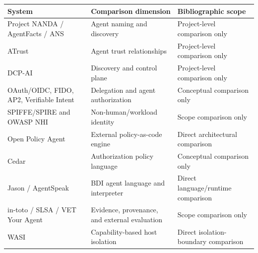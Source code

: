 \begin{tabularx}{\linewidth}{@{}XXX@{}}
\toprule
System & Comparison dimension & Bibliographic scope \\
\midrule
Project NANDA / AgentFacts / ANS & Agent naming and discovery & Project-level comparison only \\
ATrust & Agent trust relationships & Project-level comparison only \\
DCP-AI & Discovery and control plane & Project-level comparison only \\
OAuth/OIDC, FIDO, AP2, Verifiable Intent & Delegation and agent authorization & Conceptual comparison only \\
SPIFFE/SPIRE and OWASP NHI & Non-human/workload identity & Scope comparison only \\
Open Policy Agent & External policy-as-code engine & Direct architectural comparison \\
Cedar & Authorization policy language & Conceptual comparison only \\
Jason / AgentSpeak & BDI agent language and interpreter & Direct language/runtime comparison \\
in-toto / SLSA / VET Your Agent & Evidence, provenance, and external evaluation & Scope comparison only \\
WASI & Capability-based host isolation & Direct isolation-boundary comparison \\
\bottomrule
\end{tabularx}
